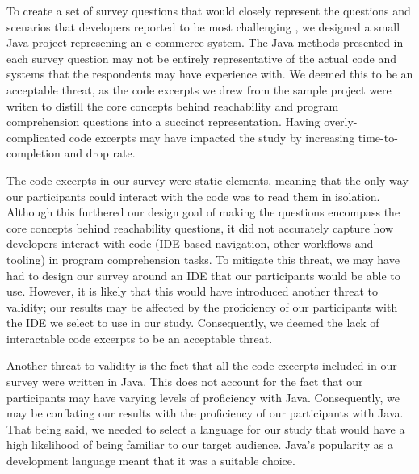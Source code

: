 \par To create a set of survey questions that would closely represent the
questions and scenarios that developers reported to be most challenging
\cite{latoza-2010-hard-questions, latoza-2010-reach}, we designed a small Java
project represening an e-commerce system.
The Java methods presented in each survey question may not be entirely
representative of the actual code and systems that the respondents may have
experience with.
We deemed this to be an acceptable threat, as the code excerpts we drew from
the sample project were writen to distill the core concepts behind
reachability and program comprehension questions into a succinct representation.
Having overly-complicated code excerpts may have impacted the study by
increasing time-to-completion and drop rate.

\par The code excerpts in our survey were static elements, meaning that the
only way our participants could interact with the code was to read them
in isolation.
Although this furthered our design goal of making the questions encompass
the core concepts behind reachability questions, it did not accurately
capture how developers interact with code (\eg IDE-based navigation, 
other workflows and tooling) in program comprehension tasks.
To mitigate this threat, we may have had to design our survey around an IDE 
that our participants would be able to use.
However, it is likely that this would have introduced another threat to
validity; our results may be affected by the proficiency of our participants
with the IDE we select to use in our study.
Consequently, we deemed the lack of interactable code excerpts to be an 
acceptable threat.

\par Another threat to validity is the fact that all the code
excerpts included in our survey were written in Java.
This does not account for the fact that our participants may have varying
levels of proficiency with Java.
Consequently, we may be conflating our results with the proficiency of our
participants with Java.
That being said, we needed to select a language for our study that would
have a high likelihood of being familiar to our target audience.
Java's popularity as a development language 
\cite{so-2021-dev-survey, jetbrains-2021-dev-survey} meant that it was a 
suitable choice.

\endinput

